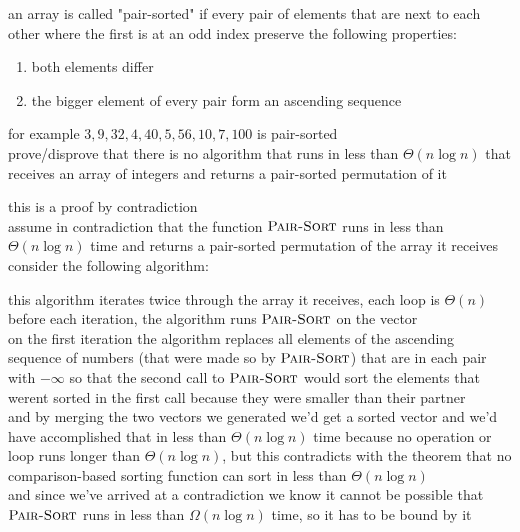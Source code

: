 \documentclass[a4paper,12pt]{article}
\begin{document}
\begin{question}
an array is called "pair-sorted" if every pair of elements that are next to each other where the first is at an odd index preserve the following properties:\\[0pt]
\begin{enumerate}
\item both elements differ\\[0pt]
\item the bigger element of every pair form an ascending sequence\\[0pt]
\end{enumerate}
for example \(3,9,32,4,40,5,56,10,7,100\) is pair-sorted\\[0pt]
prove/disprove that there is no algorithm that runs in less than \(\Theta(n\log n)\) that receives an array of integers and returns a pair-sorted permutation of it\\[0pt]
\begin{answer}
this is a proof by contradiction\\[0pt]
assume in contradiction that the function \(\textsc{Pair-Sort}\) runs in less than \(\Theta(n\log n)\) time and returns a pair-sorted permutation of the array it receives\\[0pt]
consider the following algorithm:\\[0pt]
\begin{center}

\end{center}

this algorithm iterates twice through the array it receives, each loop is \(\Theta(n)\)\\[0pt]
before each iteration, the algorithm runs \(\textsc{Pair-Sort}\) on the vector\\[0pt]
on the first iteration the algorithm replaces all elements of the ascending sequence of numbers (that were made so by \(\textsc{Pair-Sort}\)) that are in each pair with \(-\infty\) so that the second call to \(\textsc{Pair-Sort}\) would sort the elements that werent sorted in the first call because they were smaller than their partner\\[0pt]
and by merging the two vectors we generated we'd get a sorted vector and we'd have accomplished that in less than \(\Theta(n\log n)\) time because no operation or loop runs longer than \(\Theta(n\log n)\), but this contradicts with the theorem that no comparison-based sorting function can sort in less than \(\Theta(n\log n)\)\\[0pt]
and since we've arrived at a contradiction we know it cannot be possible that \(\textsc{Pair-Sort}\) runs in less than \(\Omega(n\log n)\) time, so it has to be bound by it\\[0pt]
\end{answer}
\end{question}
\end{document}
